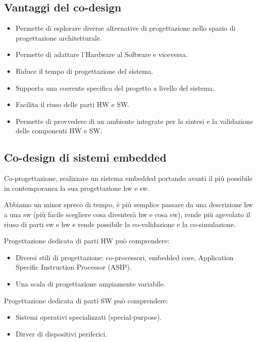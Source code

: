 \documentclass[a4paper]{article}
\theoremstyle{definition}
\begin{document}
	\subsection{Vantaggi del co-design}
		\begin{itemize}
			\item Permette di esplorare diverse alternative di progettazione nello spazio di progettazione architetturale.
			\item Permette di adattare l'Hardware al Software e viceversa.
			\item Riduce il tempo di progettazione del sistema.
			\item Supporta una coerente specifica del progetto a livello del sistema.
			\item Facilita il riuso delle parti HW e SW.
			\item Permette di provvedere di un ambiente integrate per la sintesi e la validazione delle componenti HW e SW.
		\end{itemize}
		
	\subsection{Co-design di sistemi embedded}
		Co-progettazione, realizzare un sistema embedded portando avanti il più possibile in contemporanea la sua progettazione hw e sw.
		
		\noindent
		Abbiamo un minor spreco di tempo, è più semplice passare da una descrizione hw a una sw (più facile scegliere cosa diventerà hw e cosa sw), rende più agevolato il riuso di parti sw e hw e rende possibile la co-validazione e la co-simulazione.
		
		\noindent
		Progettazione dedicata di parti HW può comprendere:
		\begin{itemize}
			\item Diversi stili di progettazione: co-processori, embedded core, Application Specific Instruction Processor (ASIP).
			\item Una scala di progettazione ampiamente variabile.
		\end{itemize}
		
		\noindent
		Progettazione dedicata di parti SW può comprendere:
		\begin{itemize}
			\item Sistemi operativi specializzati (special-purpose).
			\item Dirver di dispositivi periferici.
		\end{itemize}
		
\end{document}
